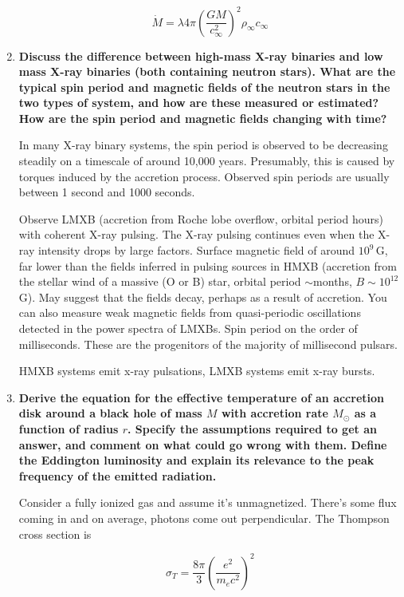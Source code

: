 \documentclass[12pt, letterpaper, preprint]{aastex}
\begin{document}
\begin{enumerate}
\begin{equation}
\dot{M} = \lambda 4 \pi \left(\frac{GM}{c^2_\infty}\right)^2 \rho_\infty c_\infty
\end{equation}

\item \textbf{Discuss the difference between high-mass X-ray binaries and low mass X-ray binaries (both containing neutron stars). What are the typical spin period and magnetic fields of the neutron stars in the two types of system, and how are these measured or estimated? How are the spin period and magnetic fields changing with time?}

In many X-ray binary systems, the spin period is observed to be decreasing steadily on a timescale of around 10,000 years. Presumably, this is caused by torques induced by the accretion process. Observed spin periods are usually between 1 second and 1000 seconds. 

Observe LMXB (accretion from Roche lobe overflow, orbital period hours) with coherent X-ray pulsing. The X-ray pulsing continues even when the X-ray intensity drops by large factors. Surface magnetic field of around $10^9$\,G, far lower than the fields inferred in pulsing sources in HMXB (accretion from the stellar wind of a massive (O or B) star, orbital period $\sim$months, $B \sim 10^{12}$\,G). May suggest that the fields decay, perhaps as a result of accretion. You can also measure weak magnetic fields from quasi-periodic oscillations detected in the power spectra of LMXBs. Spin period on the order of milliseconds. These are the progenitors of the majority of millisecond pulsars. 

HMXB systems emit x-ray pulsations, LMXB systems emit x-ray bursts.

\item \textbf{Derive the equation for the effective temperature of an
accretion disk around a black hole of mass $M$ with accretion rate
$M_\odot$ as a function of radius $r$. Specify the assumptions
required to get an answer, and comment on what could go wrong with them.
Define the Eddington luminosity and explain its relevance to the peak
frequency of the emitted radiation.}

Consider a fully ionized gas and assume it's unmagnetized. There's some flux coming in and on average, photons come out perpendicular. The Thompson cross section is

\begin{equation}
\sigma_T = \frac{8 \pi}{3} \left( \frac{e^2}{m_e c^2} \right)^2
\end{equation}


\end{enumerate}
\end{document}
